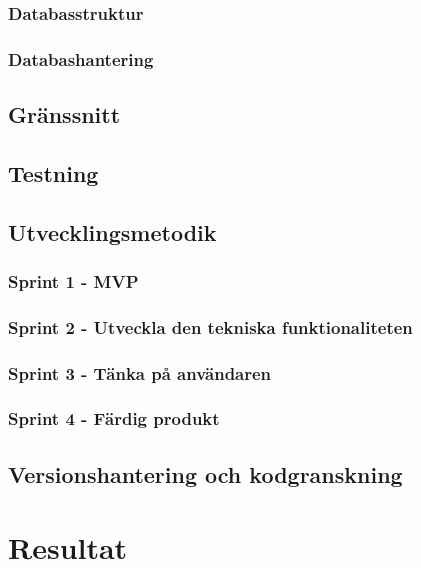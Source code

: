 \documentclass[a4paper,12pt,oneside,final]{extbook}
\begin{document}
\subsection{Databasstruktur}
\label{ssec:activerec}

\subsection{Databashantering}

\section{Gränssnitt}

\section{Testning}

\section{Utvecklingsmetodik}

\subsection{Sprint 1 - MVP}

\subsection{Sprint 2 - Utveckla den tekniska funktionaliteten}

\subsection{Sprint 3 - Tänka på användaren}

\subsection{Sprint 4 - Färdig produkt}

\section{Versionshantering och kodgranskning}

\chapter{Resultat}
\end{document}
